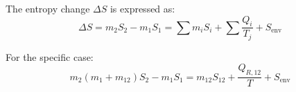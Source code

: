 The entropy change \( \Delta S \) is expressed as:  
\[
\Delta S = m_2 S_2 - m_1 S_1 = \sum m_i S_i + \sum \frac{Q_i}{T_j} + S_{\text{env}}
\]  

For the specific case:  
\[
m_{2}(m_1 + m_{12}) S_2 - m_1 S_1 = m_{12} S_{12} + \frac{Q_{R,12}}{T} + S_{\text{env}}
\]